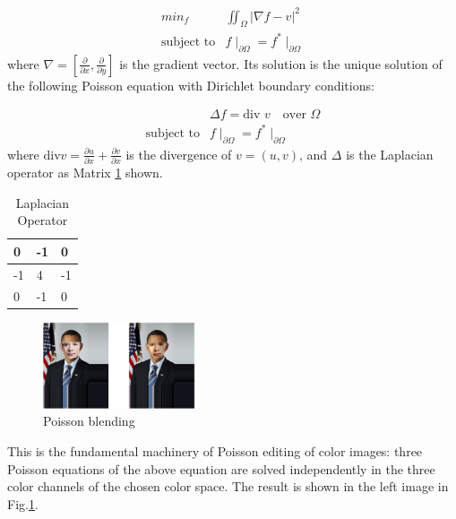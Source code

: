 \documentclass[10pt,twocolumn,letterpaper]{article}
\begin{document}
\begin{eqnarray}
min_{f} & \iint_{\Omega} \vert \nabla f -v \vert^2  \\
\mbox{subject to} & f \mid_{\partial{\Omega}} = f^* \mid_{\partial{\Omega}}
\end{eqnarray}
where $\nabla = [\frac{\partial{}}{\partial{x}}, \frac{\partial{}}{\partial{y}}]$ is the gradient vector. Its solution is the unique solution of the following Poisson equation with Dirichlet boundary conditions:

\begin{eqnarray}
& \Delta f = \mbox{div }v \quad \mbox{over } \Omega \\
\mbox{subject to} & f \mid_{\partial{\Omega}} = f^* \mid_{\partial{\Omega}}
\end{eqnarray}
where $\mbox{div} v = \frac{\partial{u}}{\partial{x}} + \frac{\partial{v}}{\partial{x}}$ is the divergence of $v = (u,v)$, and $\Delta$ is the Laplacian operator as Matrix \ref{lap} shown.

\begin{table}[h!]
\centering
\begin{tabular}{|l|l|l|}
\hline
 0 & -1 & 0 \\ \hline
 -1 & 4 & -1  \\ \hline
 0 & -1 & 0  \\ \hline
\end{tabular}
\caption{Laplacian Operator}
 \label{lap}
\end{table}

\begin{figure}[h]
  \centering
  \includegraphics[width=0.4\textwidth]{possion_blending_result.eps}
  \caption{Poisson blending}\label{blending}
\end{figure}

This is the fundamental machinery of Poisson editing of color images: three Poisson equations of the above equation are solved independently in the three color channels of the chosen color space. The result is shown in the left image in Fig.\ref{blending}.

\end{document}
